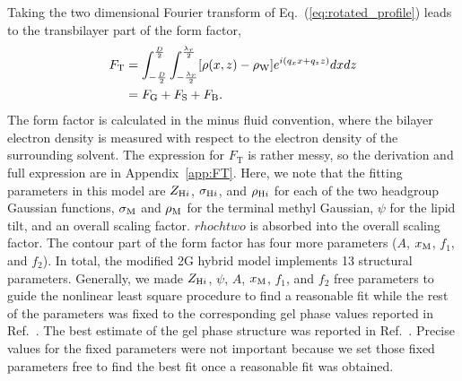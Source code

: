 Taking the two dimensional Fourier transform of Eq.~(\ref{eq:rotated_profile})
leads to the transbilayer part of the form factor,
\begin{align}
  F_\mathrm{T} 
  &= \int_{-\frac{D}{2}}^{\frac{D}{2}} \int_{-\frac{\lambda_r}{2}}^{\frac{\lambda_r}{2}} 
     \mathopen{}\left[ \rho(x,z)-\rho_\mathrm{W} \right]\mathclose{} e^{i(q_xx+q_zz)} dxdz \\
  &= F_\mathrm{G} + F_\mathrm{S} + F_\mathrm{B}.
\end{align}
The form factor is calculated in the minus fluid convention, 
where the bilayer electron density
is measured with respect to the electron density of the surrounding solvent.
The expression for $F_\mathrm{T}$ is rather messy, so 
the derivation and full expression are in Appendix~\ref{app:FT}. Here, 
we note that
the fitting parameters in this model are $Z_{\mathrm{H}i}$, $\sigma_{\mathrm{H}i}$, and 
$\rho_{\mathrm{H}i}$ for each of the two headgroup Gaussian functions, $\sigma_\mathrm{M}$ and
$\rho_\mathrm{M}$ for
the terminal methyl Gaussian, $\psi$ for
the lipid tilt, and an overall scaling factor. $rhochtwo$ is absorbed into 
the overall scaling factor. The contour part of the 
form factor has four more parameters ($A$, $x_\textrm{M}$, $f_1$, and $f_2$).
In total, the modified 2G hybrid model implements 13 structural parameters.
Generally, we made $Z_{\mathrm{H}i}$, $\psi$, $A$, $x_\textrm{M}$, $f_1$, and $f_2$ free parameters
to guide the nonlinear least square procedure to find a reasonable fit
while the rest of the parameters was fixed to the corresponding gel phase values 
reported in Ref.~\cite{ref:Wiener89}. 
The best estimate of the gel phase structure was reported in
Ref.~\cite{Tristram-Nagle02}. Precise values for the fixed parameters
were not important because we set those fixed parameters free to find the best fit
once a reasonable fit was obtained.

